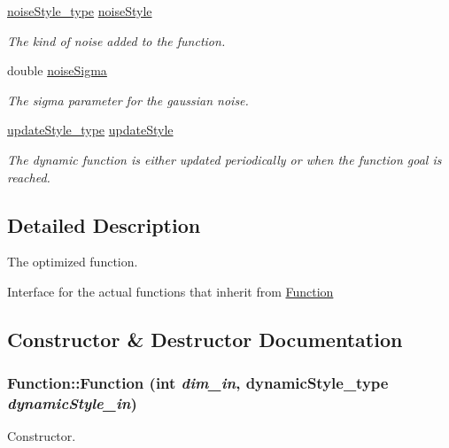 \begin{CompactItemize}
\hyperlink{optfunctions_8h_b2443d91d959f9b3a033d74864a28862}{noiseStyle\_\-type} \hyperlink{classFunction_aa5472c04034818ced6ad381760451c3}{noiseStyle}
\begin{CompactList}\small\item\em The kind of noise added to the function. \item\end{CompactList}\item 
double \hyperlink{classFunction_a2192bf028cf97293a9ae6863a909caf}{noiseSigma}
\begin{CompactList}\small\item\em The sigma parameter for the gaussian noise. \item\end{CompactList}\item 
\hyperlink{optfunctions_8h_42f59cdfb9d4008508628c2db63d1233}{updateStyle\_\-type} \hyperlink{classFunction_fc687e3f2c1ee87897c5bf22aeb11ab6}{updateStyle}
\begin{CompactList}\small\item\em The dynamic function is either updated periodically or when the function goal is reached. \item\end{CompactList}\end{CompactItemize}


\subsection{Detailed Description}
The optimized function. 

Interface for the actual functions that inherit from \hyperlink{classFunction}{Function} 

\subsection{Constructor \& Destructor Documentation}
\hypertarget{classFunction_bd175da63d6074598263a19bec3b1241}{
\subsubsection{\setlength{\rightskip}{0pt plus 5cm}Function::Function (int {\em dim\_\-in}, \/  {\bf dynamicStyle\_\-type} {\em dynamicStyle\_\-in})}}
\label{classFunction_bd175da63d6074598263a19bec3b1241}


Constructor. 


